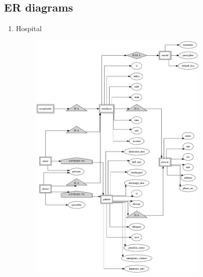 \documentclass[11pt]{article}%
\begin{document}
\subsection{ER diagrams}

\begin{enumerate}

\item{\large{ Hospital }}
\\
\begin{figure}[H]

\includegraphics[width = 0.81\textwidth]{fig/hosp.png}

\end{figure}


\end{enumerate}
\end{document}
